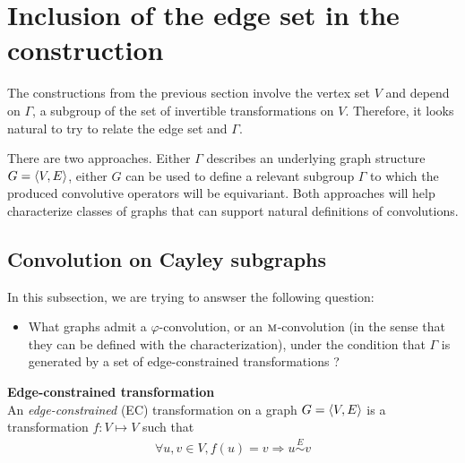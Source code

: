 \section{Inclusion of the edge set in the construction}
\label{sec:edges}


The constructions from the previous section involve the vertex set $V$ and depend on $\Gamma$, a subgroup of the set of invertible transformations on $V$. Therefore, it looks natural to try to relate the edge set and $\Gamma$.

There are two approaches. Either $\Gamma$ describes an underlying graph structure $G = \langle V, E \rangle$, either $G$ can be used to define a relevant subgroup $\Gamma$ to which the produced convolutive operators will be equivariant. Both approaches will help characterize classes of graphs that can support natural definitions of convolutions.




\subsection{Convolution on Cayley subgraphs}
\label{sec:cayley}

In this subsection, we are trying to answser the following question:
\begin{itemize}
	\item What graphs admit a $\varphi$-convolution, or an $\operatorname{\textsc{m}}$-convolution (in the sense that they can be defined with the characterization), under the condition that $\Gamma$ is generated by a set of edge-constrained transformations ?
\end{itemize}

\begin{definition}\textbf{Edge-constrained transformation}\\
An \emph{edge-constrained} (EC) transformation on a graph $G = \langle V, E \rangle$ is a transformation $f: V \mapsto V$ such that
\begin{gather*}
\forall u,v \in V, f(u) = v \Rightarrow u \overset{E}{\sim} v
\end{gather*}
\end{definition}

